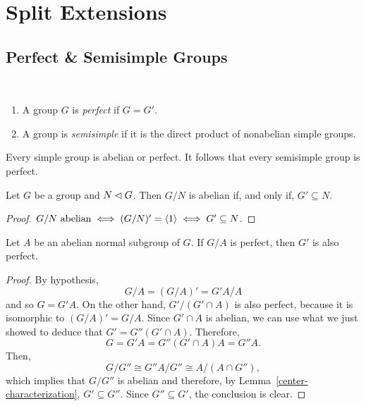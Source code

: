 \chapter{Split Extensions}

\section{Perfect \& Semisimple Groups}

\begin{defns}${}$

    \begin{enumerate}[-]
    \item A group\/ $G$ is \textsl{perfect} if\/ $G=G'$.

    \item A group is \textsl{semisimple} if it is the direct product of nonabelian simple groups.

    \end{enumerate}

\end{defns}

\begin{rem}
    Every simple group is abelian or perfect. It follows that every semisimple group is perfect.
\end{rem}

\begin{lem}\label{center-characterization}
    Let\/ $G$ be a group and\/ $N\lhd G$. Then\/ $G/N$ is abelian if, and only if, $G'\subseteq N$.
\end{lem}
    
\begin{proof} $G/N \text{ abelian} \iff (G/N)'=\langle1\rangle \iff G'\subseteq N$.
 \end{proof}

\begin{prop}\label{G/abelian-perfect}
    Let\/ $A$ be an abelian normal subgroup of\/ $G$. If\/ $G/A$ is perfect, then\/ $G'$ is also perfect.
\end{prop}

\begin{proof} By hypothesis,
$$
    G/A = (G/A)' = G'A/A
$$
and so $G=G'A$. On the other hand, $G'/(G'\cap A)$ is also perfect, because it is isomorphic to $(G/A)' = G/A$. Since $G'\cap A$ is abelian, we can use what we just showed to deduce that $G'=G''(G'\cap A)$. Therefore,
$$
    G = G'A = G''(G'\cap A)A = G''A.
$$
Then,
$$
    G/G'' \cong G''A/G'' \cong A/(A\cap G''),
$$
which implies that $G/G''$ is abelian and therefore, by Lemma~\ref{center-characterization}, $G'\subseteq G''$. Since $G''\subseteq G'$, the conclusion is clear.  \end{proof}

